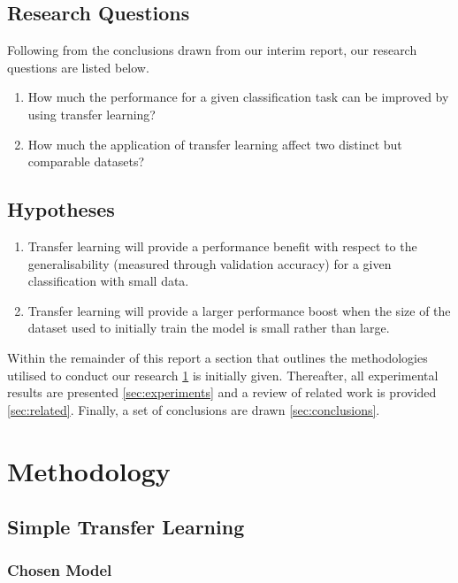 \documentclass{article}
\begin{document}
\subsection{Research Questions}
\label{sec:questions}

Following from the conclusions drawn from our interim report, our research questions are listed below.

\begin{enumerate}
  \item How much the performance for a given classification task can be improved by using transfer learning?  
  \item How much the application of transfer learning affect two distinct but comparable datasets?
\end{enumerate}

\subsection{Hypotheses}
\label{sec:hypotheses}
\begin{enumerate}[label=\textbf{H.\arabic*}]
  \item \label{h:1} Transfer learning will provide a performance benefit with respect to the generalisability (measured through validation accuracy) for a given classification with small data.
  \item \label{h:2} Transfer learning will provide a larger performance boost when the size of the dataset used to initially train the model is small rather than large.
\end{enumerate}

Within the remainder of this report a section that outlines the methodologies utilised to conduct our research \ref{sec:methodology} is initially given. Thereafter, all experimental results are presented \ref{sec:experiments} and a review of related work is provided \ref{sec:related}. Finally, a set of conclusions are drawn \ref{sec:conclusions}.

\section{Methodology}
\label{sec:methodology}

\subsection{Simple Transfer Learning}
\label{sec:transferlearninng}

\subsubsection{\textbf{Chosen Model}}
\end{document}
